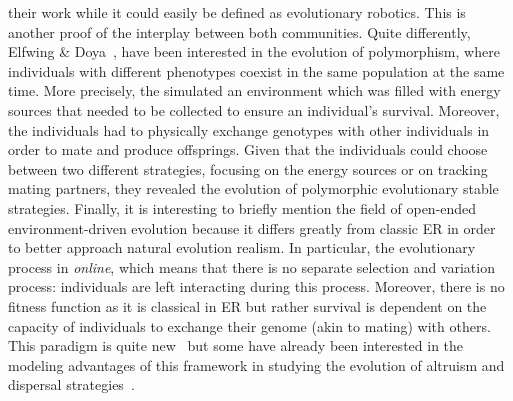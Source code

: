 their work while it could easily be defined as evolutionary robotics. This is another proof of the interplay between both communities. Quite differently, Elfwing & Doya~\cite{Elfwing2014a}, have been interested in the evolution of polymorphism, where individuals with different phenotypes coexist in the same population at the same time. More precisely, the simulated an environment which was filled with energy sources that needed to be collected to ensure an individual's survival. Moreover, the individuals had to physically exchange genotypes with other individuals in order to mate and produce offsprings. Given that the individuals could choose between two different strategies, focusing on the energy sources or on tracking mating partners, they revealed the evolution of polymorphic evolutionary stable strategies. Finally, it is interesting to briefly mention the field of open-ended environment-driven evolution because it differs greatly from classic ER in order to better approach natural evolution realism. In particular, the evolutionary process in \emph{online}, which means that there is no separate selection and variation process: individuals are left interacting during this process. Moreover, there is no fitness function as it is classical in ER but rather survival is dependent on the capacity of individuals to exchange their genome (akin to mating) with others. This paradigm is quite new~\cite{Bredeche2010, Bredeche2012} but some have already been interested in the modeling advantages of this framework in studying the evolution of altruism and dispersal strategies~\cite{Montanier2011, Montanier2013}.

